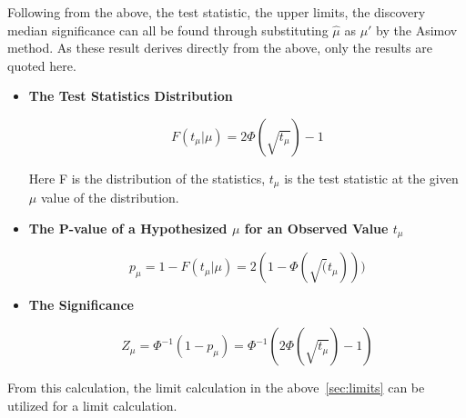 Following from the above, the test statistic, the upper limits, the discovery median significance can all be found through substituting $\hat{\mu}$ as $\mu'$ by the Asimov method. As these result derives directly from the above, only the results are quoted here. 

\begin{itemize}
    \item \textbf{The Test Statistics Distribution}

\begin{equation}
    F(t_{\mu}| \mu) = 2\Phi(\sqrt{t_{\mu}})-1
\label{eq:teststatistics}
\end{equation}

Here F is the distribution of the statistics, $t_\mu$ is the test statistic at the given $\mu$ value of the distribution. 

\item \textbf{The P-value of a Hypothesized $\mu$ for an Observed Value $t_\mu$}

\begin{equation}
p_{\mu} = 1-F(t_{\mu}| \mu)=2(1-\Phi(\sqrt(t_{\mu})))
\end{equation}


\item \textbf{The Significance}

\begin{equation}
Z_{\mu} = \Phi^{-1}(1-p_{\mu})  = \Phi^{-1}(2\Phi(\sqrt{t_{\mu}})-1)
\end{equation}

\end{itemize}

From this calculation, the limit calculation in the above~\ref{sec:limits} can be utilized for a limit calculation. 

%
%
%



%
%


